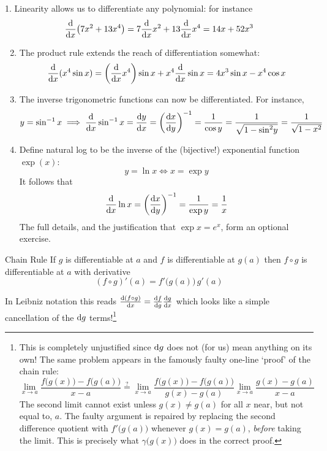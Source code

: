 \begin{examples}{}{}
\hangindent\leftmargin
\textup{1. } Linearity allows us to differentiate any polynomial: for instance
	\[\diff x\big(7x^2+13x^4\big)=7\diff xx^2+13\diff xx^4=14x+52x^3\]
\begin{enumerate}\setcounter{enumi}{1}
	\item The product rule extends the reach of differentiation somewhat:
	\[\diff x(x^4\sin x) =\left(\diff xx^4\right)\sin x+x^4\diff x\sin x = 4x^3\sin x-x^4\cos x\]
	\item The inverse trigonometric functions can now be differentiated. For instance,
	\[y=\sin^{-1}x\implies \diff x\sin^{-1}x=\diff[y]{x}=\left(\diff[x]{y}\right)^{-1}=\frac 1{\cos y}=\frac 1{\sqrt{1-\sin^2\!y}}=\frac 1{\sqrt{1-x^2}}\]
	
	\item Define natural log to be the inverse of the (bijective!) exponential function $\exp(x)$:
	\[y=\ln x\iff x=\exp y\]
	It follows that
	\[\diff x\ln x=\left(\diff[x]{y}\right)^{-1}=\frac 1{\exp y}=\frac 1x\]
	The full details, and the justification that $\exp x=e^x$, form an optional exercise.
\end{enumerate}
\end{examples}\goodbreak


\begin{thm}{Chain Rule}{}
If $g$ is differentiable at $a$ and $f$ is differentiable at $g(a)$ then $f\circ g$ is differentiable at $a$ with derivative
\[(f\circ g)'(a)=f'\big(g(a)\big)\,g'(a)\]
\end{thm}

In Leibniz notation this reads $\diff[(f\circ g)]{x}=\diff[f]{g}\diff[g]{x}$ which looks like a simple cancellation of the $\dg$ terms!\footnote{
This is completely unjustified since $\dg$ does not (for us) mean anything on its own! The same problem appears in the famously faulty one-line `proof' of the chain rule:
\[\lim_{x\to a}\frac{f\big(g(x)\big)-f\big(g(a)\big)}{x-a} \overset{\text{?}}{=} \lim_{x\to a}\frac{f\big(g(x)\big)-f\big(g(a)\big)}{g(x)-g(a)} \lim_{x\to a}\frac{g(x)-g(a)}{x-a}\]
The second limit cannot exist unless $g(x)\neq g(a)$ for all $x$ near, but not equal to, $a$. The faulty argument is repaired by replacing the second difference quotient with $f'\big(g(a))$ whenever $g(x)=g(a)$, \emph{before} taking the limit. This is precisely what $\gamma\bigl(g(x)\bigr)$ does in the correct proof.}



